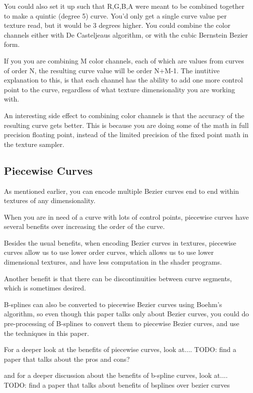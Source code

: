 \documentclass{jcgt}
\begin{document}
You could also set it up such that R,G,B,A were meant to be combined together to make a quintic (degree 5) curve.  You'd only get a single curve value per texture read, but it would be 3 degrees higher.  You could combine the color channels either with De Casteljeaus algorithm, or with the cubic Bernstein Bezier form. 

If you you are combining M color channels, each of which are values from curves of order N, the resulting curve value will be order N+M-1.  The inutitive explanation to this, is that each channel has the ability to add one more control point to the curve, regardless of what texture dimensionality you are working with.

An interesting side effect to combining color channels is that the accuracy of the resulting curve gets better.  This is because you are doing some of the math in full precision floating point, instead of the limited precision of the fixed point math in the texture sampler.

\subsection{Piecewise Curves}

As mentioned earlier, you can encode multiple Bezier curves end to end within textures of any dimensionality.

When you are in need of a curve with lots of control points, piecewise curves have several benefits over increasing the order of the curve.

Besides the usual benefits, when encoding Bezier curves in textures, piecewise curves allow us to use lower order curves, which allows us to use lower dimensional textures, and have less computation in the shader programs.

Another benefit is that there can be discontinuities between curve segments, which is sometimes desired.

B-splines can also be converted to piecewise Bezier curves using Boehm's algorithm, so even though this paper talks only about Bezier curves, you could do pre-processing of B-splines to convert them to piecewise Bezier curves, and use the techniques in this paper. 

For a deeper look at the benefits of piecewise curves, look at....
TODO: find a paper that talks about the pros and cons?

and for a deeper discussion about the benefits of b-spline curves, look at....
TODO: find a paper that talks about benefits of bsplines over bezier curves
\end{document}
